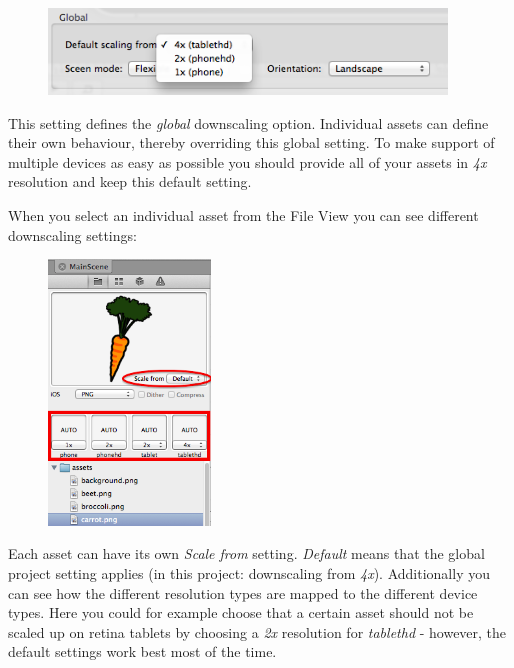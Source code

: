 \begin{figure}[H]
		\centering
		\includegraphics[width=300pt]{images/Chapter2/DownScalingGlobal.png}
\end{figure}

This setting defines the \textit{global} downscaling option. Individual assets
can define their own behaviour, thereby overriding this global setting. To make
support of multiple devices as easy as possible you should provide all of your
assets in \textit{4x} resolution and keep this default setting.

When you select an individual asset from the File View you can see different
downscaling settings:

\begin{figure}[H]
		\centering
		\includegraphics[height=200pt]{images/Chapter2/DownScalingPerAsset.png}
\end{figure}

Each asset can have its own \textit{Scale from} setting. \textit{Default} means
that the global project setting applies (in this project: downscaling from
\textit{4x}). Additionally you can see how the different resolution types are
mapped to the different device types. Here you could for example choose that a
certain asset should not be scaled up on retina tablets by choosing a
\textit{2x} resolution for \textit{tablethd} - however, the default settings
work best most of the time.


